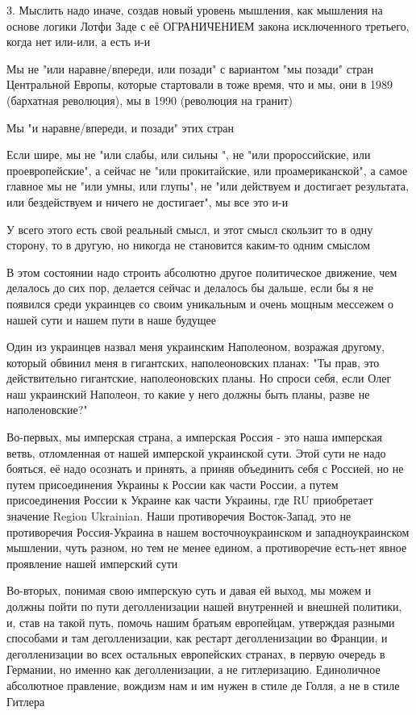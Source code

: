 \begin{itemize}
\begin{itemize}
3. Мыслить надо иначе, создав новый уровень мышления, как мышления на основе
логики Лотфи Заде с её ОГРАНИЧЕНИЕМ закона исключенного третьего, когда нет
или-или, а есть и-и

Мы не "или наравне/впереди, или позади" с вариантом "мы позади" стран
Центральной Европы, которые стартовали в тоже время, что и мы, они в 1989
(бархатная революция), мы в 1990 (революция на гранит)

Мы "и наравне/впереди, и позади" этих стран

Если шире, мы не "или слабы, или сильны ", не "или пророссийские, или
проевропейские", а сейчас не "или прокитайские, или проамериканской", а самое
главное мы не "или умны, или глупы", не "или действуем и достигает результата,
или бездействуем и ничего не достигает", мы все это и-и

У всего этого есть свой реальный смысл, и этот смысл скользит то в одну
сторону, то в другую, но никогда не становится каким-то одним смыслом

В этом состоянии надо строить абсолютно другое политическое движение, чем
делалось до сих пор, делается сейчас и делалось бы дальше, если бы я не
появился среди украинцев со своим уникальным и очень мощным мессежем о нашей
сути и нашем пути в наше будущее

Один из украинцев назвал меня украинским Наполеоном, возражая другому, который
обвинил меня в гигантских, наполеоновских планах: "Ты прав, это действительно
гигантские, наполеоновских планы. Но спроси себя, если Олег наш украинский
Наполеон, то какие у него должны быть планы, разве не наполеновские?"

Во-первых, мы имперская страна, а имперская Россия - это наша имперская ветвь,
отломленная от нашей имперской украинской сути. Этой сути не надо бояться, её
надо осознать и принять, а приняв объединить себя с Россией, но не путем
присоединения Украины к России как части России, а путем присоединения России к
Украине как части Украины, где RU приобретает значение Region Ukrainian. Наши
противоречия Восток-Запад, это не противоречия Россия-Украина в нашем
восточноукраинском и западноукраинском мышлении, чуть разном, но тем не менее
едином, а противоречие есть-нет явное проявление нашей имперский сути

Во-вторых, понимая свою имперскую суть и давая ей выход, мы можем и должны
пойти по пути деголленизации нашей внутренней и внешней политики, и, став на
такой путь, помочь нашим братьям европейцам, утверждая разными способами и там
деголленизации, как рестарт деголленизации во Франции, и деголленизации во всех
остальных европейских странах, в первую очередь в Германии, но именно как
деголленизации, а не гитлеризацию. Единоличное абсолютное правление, вождизм
нам и им нужен в стиле де Голля, а не в стиле Гитлера


\end{itemize}
\end{itemize}

